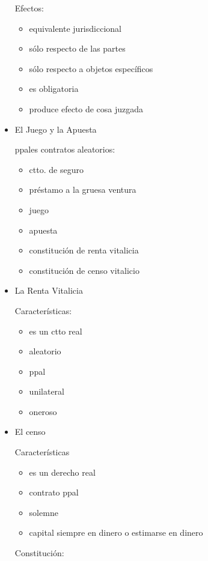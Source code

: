 \documentclass[]{article}
\providecommand{\tightlist}{%
  \setlength{\itemsep}{0pt}\setlength{\parskip}{0pt}}
\begin{document}
\begin{itemize}
  Efectos:

  \begin{itemize}
  \tightlist
  \item
    equivalente jurisdiccional
  \item
    sólo respecto de las partes
  \item
    sólo respecto a objetos específicos
  \item
    es obligatoria
  \item
    produce efecto de cosa juzgada
  \end{itemize}
\item
  El Juego y la Apuesta

  ppales contratos aleatorios:

  \begin{itemize}
  \tightlist
  \item
    ctto. de seguro
  \item
    préstamo a la gruesa ventura
  \item
    juego
  \item
    apuesta
  \item
    constitución de renta vitalicia
  \item
    constitución de censo vitalicio
  \end{itemize}
\item
  La Renta Vitalicia

  Características:

  \begin{itemize}
  \tightlist
  \item
    es un ctto real
  \item
    aleatorio
  \item
    ppal
  \item
    unilateral
  \item
    oneroso
  \end{itemize}
\item
  El censo

  Características

  \begin{itemize}
  \tightlist
  \item
    es un derecho real
  \item
    contrato ppal
  \item
    solemne
  \item
    capital siempre en dinero o estimarse en dinero
  \end{itemize}

  Constitución:


\end{itemize}
\end{document}
